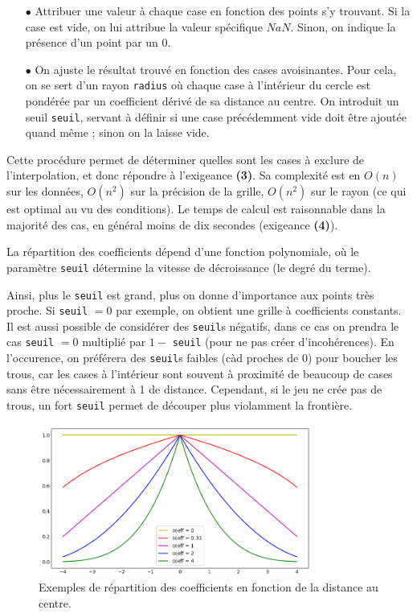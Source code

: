 \documentclass[12pt]{article}
\begin{document}
    \begin{enumerate}
        \item[$\bullet$] Attribuer une valeur à chaque case en fonction des points s'y trouvant. Si la case est vide, on lui attribue la valeur spécifique $NaN$. Sinon, on indique la présence d'un point par un $0$.
        \item[$\bullet$] On ajuste le résultat trouvé en fonction des cases avoisinantes. Pour cela, on se sert d'un rayon \texttt{radius} où chaque case à l'intérieur du cercle est pondérée par un coefficient dérivé de sa distance au centre. On introduit un seuil \texttt{seuil}, servant à définir si une case précédemment vide doit être ajoutée quand même ; sinon on la laisse vide.
    \end{enumerate}

    Cette procédure permet de déterminer quelles sont les cases à exclure de l'interpolation, et donc répondre à l'exigeance \textbf{(3)}. Sa complexité est en $O(n)$ sur les données, $O(n^{2})$ sur la précision de la grille, $O(n^{2})$ sur le rayon (ce qui est optimal au vu des conditions). Le temps de calcul est raisonnable dans la majorité des cas, en général moins de dix secondes (exigeance \textbf{(4)}).

    La répartition des coefficients dépend d'une fonction polynomiale, où le paramètre \texttt{seuil} détermine la vitesse de décroissance (le degré du terme).

    Ainsi, plus le \texttt{seuil} est grand, plus on donne d'importance aux points très proche. Si \texttt{seuil} $= 0$ par exemple, on obtient une grille à coefficients constants. Il est aussi possible de considérer des \texttt{seuil}s négatifs, dans ce cas on prendra le cas \texttt{seuil} $= 0$ multiplié par $1 -$ \texttt{seuil} (pour ne pas créer d'incohérences). En l'occurence, on préférera des \texttt{seuil}s faibles (càd proches de 0) pour boucher les trous, car les cases à l'intérieur sont souvent à proximité de beaucoup de cases sans être nécessairement à 1 de distance. Cependant, si le jeu ne crée pas de trous, un fort \texttt{seuil} permet de découper plus violamment la frontière.

    \begin{figure}[ht!]
        \centering
        \includegraphics[width=0.8\textwidth]{Images/Grid_FirstAlg_CoeffCurve.png}
        \caption{Exemples de répartition des coefficients en fonction de la distance au centre.}
    \end{figure}
\end{document}
